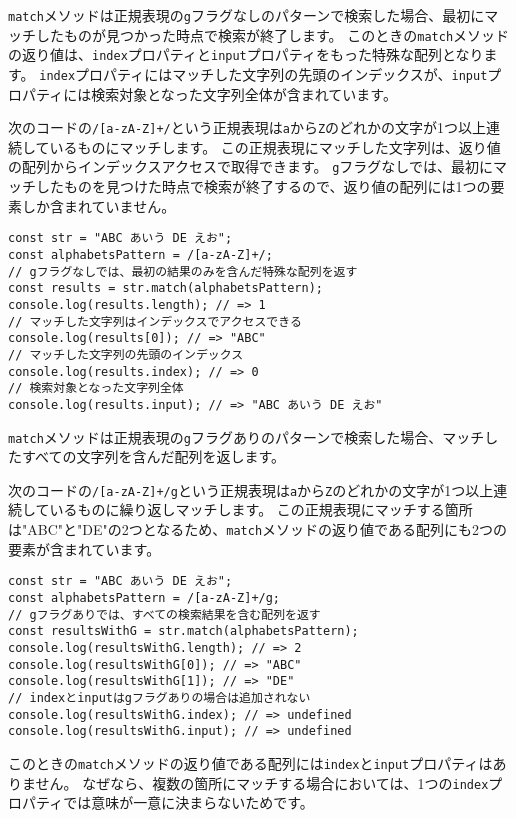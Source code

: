 \texttt{match}メソッドは正規表現の\texttt{g}フラグなしのパターンで検索した場合、最初にマッチしたものが見つかった時点で検索が終了します。
このときの\texttt{match}メソッドの返り値は、\texttt{index}プロパティと\texttt{input}プロパティをもった特殊な配列となります。
\texttt{index}プロパティにはマッチした文字列の先頭のインデックスが、\texttt{input}プロパティには検索対象となった文字列全体が含まれています。

次のコードの\texttt{/[a-zA-Z]+/}という正規表現は\texttt{a}から\texttt{Z}のどれかの文字が1つ以上連続しているものにマッチします。
この正規表現にマッチした文字列は、返り値の配列からインデックスアクセスで取得できます。
\texttt{g}フラグなしでは、最初にマッチしたものを見つけた時点で検索が終了するので、返り値の配列には1つの要素しか含まれていません。

\begin{lstlisting}
const str = "ABC あいう DE えお";
const alphabetsPattern = /[a-zA-Z]+/;
// gフラグなしでは、最初の結果のみを含んだ特殊な配列を返す
const results = str.match(alphabetsPattern);
console.log(results.length); // => 1
// マッチした文字列はインデックスでアクセスできる
console.log(results[0]); // => "ABC"
// マッチした文字列の先頭のインデックス
console.log(results.index); // => 0
// 検索対象となった文字列全体
console.log(results.input); // => "ABC あいう DE えお"
\end{lstlisting}

\texttt{match}メソッドは正規表現の\texttt{g}フラグありのパターンで検索した場合、マッチしたすべての文字列を含んだ配列を返します。

次のコードの\texttt{/[a-zA-Z]+/g}という正規表現は\texttt{a}から\texttt{Z}のどれかの文字が1つ以上連続しているものに繰り返しマッチします。
この正規表現にマッチする箇所は"ABC"と"DE"の2つとなるため、\texttt{match}メソッドの返り値である配列にも2つの要素が含まれています。

\begin{lstlisting}
const str = "ABC あいう DE えお";
const alphabetsPattern = /[a-zA-Z]+/g;
// gフラグありでは、すべての検索結果を含む配列を返す
const resultsWithG = str.match(alphabetsPattern);
console.log(resultsWithG.length); // => 2
console.log(resultsWithG[0]); // => "ABC"
console.log(resultsWithG[1]); // => "DE"
// indexとinputはgフラグありの場合は追加されない
console.log(resultsWithG.index); // => undefined
console.log(resultsWithG.input); // => undefined
\end{lstlisting}

このときの\texttt{match}メソッドの返り値である配列には\texttt{index}と\texttt{input}プロパティはありません。
なぜなら、複数の箇所にマッチする場合においては、1つの\texttt{index}プロパティでは意味が一意に決まらないためです。

